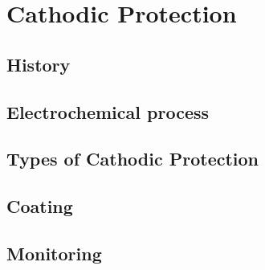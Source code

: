 
\chapter{Cathodic Protection}\label{ch:cp}

\section{History}

\section{Electrochemical process}

\section{Types of Cathodic Protection}

\section{Coating}

\section{Monitoring}